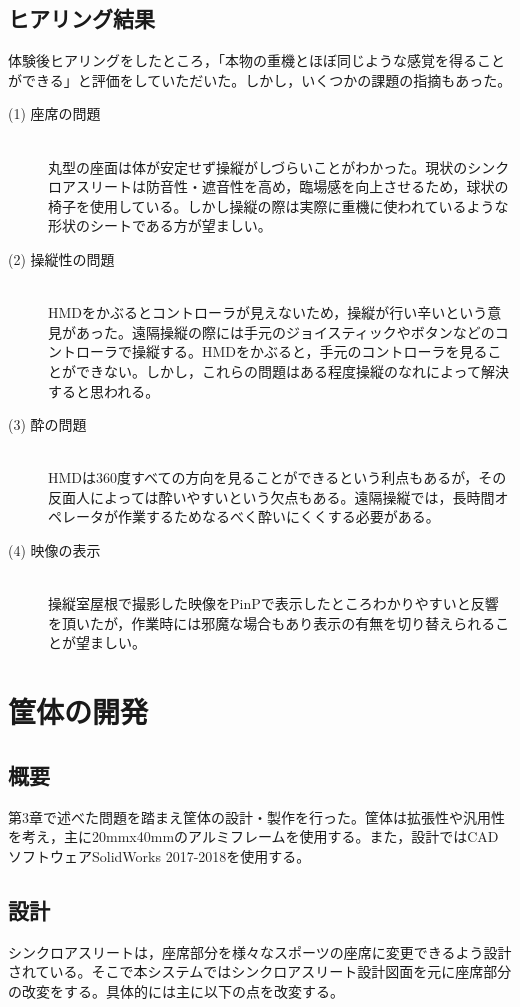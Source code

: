 \documentclass[a4paper,12pt]{jsarticle}
\begin{document}
\clearpage
\subsection{ヒアリング結果}
体験後ヒアリングをしたところ，「本物の重機とほぼ同じような感覚を得ることができる」と評価をしていただいた。しかし，いくつかの課題の指摘もあった。

\begin{description}
  \item[(1) 座席の問題]\mbox{}\\丸型の座面は体が安定せず操縦がしづらいことがわかった。現状のシンクロアスリートは防音性・遮音性を高め，臨場感を向上させるため，球状の椅子を使用している。しかし操縦の際は実際に重機に使われているような形状のシートである方が望ましい。
  \item[(2) 操縦性の問題]\mbox{}\\HMDをかぶるとコントローラが見えないため，操縦が行い辛いという意見があった。遠隔操縦の際には手元のジョイスティックやボタンなどのコントローラで操縦する。HMDをかぶると，手元のコントローラを見ることができない。しかし，これらの問題はある程度操縦のなれによって解決すると思われる。
  \item[(3) 酔の問題]\mbox{}\\HMDは360度すべての方向を見ることができるという利点もあるが，その反面人によっては酔いやすいという欠点もある。遠隔操縦では，長時間オペレータが作業するためなるべく酔いにくくする必要がある。
  \item[(4) 映像の表示]\mbox{}\\操縦室屋根で撮影した映像をPinPで表示したところわかりやすいと反響を頂いたが，作業時には邪魔な場合もあり表示の有無を切り替えられることが望ましい。
\end{description}

\clearpage

\section{筐体の開発}
\subsection{概要}
第3章で述べた問題を踏まえ筐体の設計・製作を行った。筐体は拡張性や汎用性を考え，主に20mmx40mmのアルミフレームを使用する。また，設計ではCADソフトウェアSolidWorks 2017-2018を使用する。

\subsection{設計}
シンクロアスリートは，座席部分を様々なスポーツの座席に変更できるよう設計されている。そこで本システムではシンクロアスリート設計図面を元に座席部分の改変をする。具体的には主に以下の点を改変する。
\end{document}
